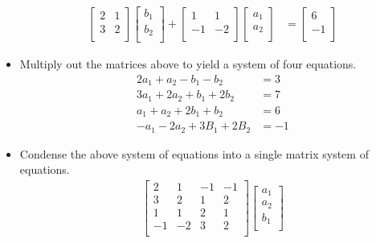 \documentclass{article}
\begin{document}
\begin{itemize}
\begin{align*}
        \begin{bmatrix}
            2 & 1\\
            3 & 2\\
        \end{bmatrix}
        \begin{bmatrix}
            b_1\\
            b_2\\
        \end{bmatrix}
        +
        \begin{bmatrix}
            1 & 1\\
            -1 & -2\\
        \end{bmatrix}
        \begin{bmatrix}
            a_1\\
            a_2\\
        \end{bmatrix}
        &=
        \begin{bmatrix}
            6\\
            -1\\
        \end{bmatrix}
    \end{align*}
    \item Multiply out the matrices above to yield a system of four equations.
    \begin{align*}
        2a_1+a_2-b_1-b_2 &= 3\\
        3a_1+2a_2+b_1+2b_2 &= 7\\
        a_1+a_2+2b_1+b_2 &= 6\\
        -a_1-2a_2+3B_1+2B_2 &= -1
    \end{align*}
    \item Condense the above system of equations into a single matrix system of equations.
    \begin{align*}
        \begin{bmatrix}
            2 & 1 & -1 & -1\\
            3 & 2 & 1 & 2\\
            1 & 1 & 2 & 1\\
            -1 & -2 & 3 & 2\\
        \end{bmatrix}
        \begin{bmatrix}
            a_1\\
            a_2\\
            b_1\\

\end{bmatrix}
\end{align*}
\end{itemize}
\end{document}
